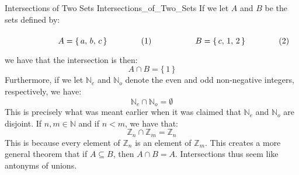         \begin{lexample}{Intersections of Two Sets}
                        {Intersections_of_Two_Sets}
            If we let $A$ and $B$ be the sets defined by:
            \par\hfill\par
            \begin{subequations}
                \begin{minipage}[b]{0.49\textwidth}
                    \begin{equation}
                        A=\{\,a,\,b,\,c\,\}
                    \end{equation}
                \end{minipage}
                \hfill
                \begin{minipage}[b]{0.49\textwidth}
                    \begin{equation}
                        B=\{\,c,\,1,\,2\,\}
                    \end{equation}
                \end{minipage}
            \end{subequations}
            \par\vspace{2.5ex}
            we have that the intersection is then:
            \begin{equation}
                A\cap{B}=\{\,1\,\}
            \end{equation}
            Furthermore, if we let $\mathbb{N}_{e}$ and $\mathbb{N}_{o}$ denote
            the even and odd non-negative integers, respectively, we have:
            \begin{equation}
                \mathbb{N}_{e}\cap\mathbb{N}_{o}=\emptyset
            \end{equation}
            This is precisely what was meant earlier when it was claimed that
            $\mathbb{N}_{e}$ and $\mathbb{N}_{o}$ are disjoint. If
            $n,m\in\mathbb{N}$ and if $n<m$, we have that:
            \begin{equation}
                \mathbb{Z}_{n}\cap\mathbb{Z}_{m}=\mathbb{Z}_{n}
            \end{equation}
            This is because every element of $\mathbb{Z}_{n}$ is an element
            of $\mathbb{Z}_{m}$. This creates a more general theorem that if
            $A\subseteq{B}$, then $A\cap{B}=A$. Intersections thus seem like
            antonyms of unions.
        \end{lexample}
